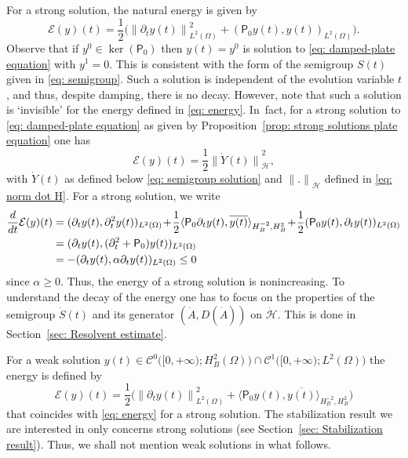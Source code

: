 \documentclass[JEP,XML,SOM,Unicode,published]{cedram}
\theoremstyle{plain}
\theoremstyle{definition}
\let \Re \relax
\DeclareMathOperator{\Re}{Re}
\newcommand{\ovl}[1]{\overline{#1}}
\newcommand{\inp}[2]{(#1, #2)}
\newcommand{\dup}[2]{\langle #1 , #2 \rangle}
\renewcommand{\H}{{\mathcal H}}
\newcommand{\E}{\ensuremath{\mathcal E}}
\newcommand{\Norm}[2]{{\| #1 \|}_{#2}}
\newcommand{\Con}{\ensuremath{\mathscr C}}
\newcommand{\Pell}{\mathsf P_0}
\begin{document}
For a strong solution, the natural energy is given by
\begin{equation}
\label{eq: energy}
\E(y) (t) = \frac12 \big(\Norm{\partial_t y (t)}{L^2(\Omega)}^2
+ \inp{\Pell y (t)}{y (t)}_{L^2(\Omega)}
\big).
\end{equation}
Observe that if $y^0 \in \ker(\Pell)$ then $y(t) = y^0$ is solution
to \eqref{eq: damped-plate equation} with $y^1=0$. This is
consistent with the form of the semigroup $S(t)$ given in \eqref{eq:
semigroup}. Such a solution is independent of the evolution
variable $t$, and thus, despite damping, there is no decay. However,
note that such a solution is `invisible' for the energy defined in
\eqref{eq: energy}. In~fact, for a strong solution to \eqref{eq:
damped-plate equation} as given by Proposition~\ref{prop: strong solutions plate equation} one has
\begin{equation}
\label{eq: connection energy norm H dot}
\E(y) (t) = \frac12 \Norm{\dot Y(t)}{\dot \H}^2,
\end{equation}
with $\dot Y(t)$ as defined below
\eqref{eq: semigroup solution} and $\Norm{.}{\dot \H}$ defined in
\eqref{eq: norm dot H}. For a strong solution, we write
\begin{align*}
\frac{d}{d t} \E(y) (t)
&= \Re \inp{\partial_t y(t) }{\partial_t^2 y(t)}_{L^2(\Omega)}
\!+\! \frac12 \dup{\Pell \partial_t y(t)}{\ovl{y(t)}}_{H^{-2}_B, H^2_B} \!+\! \frac12 \inp{\Pell y(t)}{\partial_t y(t)}_{L^2(\Omega)}\\
&= \Re \inp{\partial_t y(t) }{(\partial_t^2 + \Pell) y(t)}_{L^2(\Omega)}\\
&= - \Re \inp{\partial_t y(t) }{\alpha\partial_t y(t)}_{L^2(\Omega)} \leq 0
\end{align*}
since $\alpha \geq 0$. Thus, the energy of a strong solution is nonincreasing.
To understand the decay of the energy one has to focus on the
properties of the semigroup $\dot S(t)$ and its generator $(\dot A,
D(\dot A))$ on $\dot \H$. This is done in Section~\ref{sec: Resolvent estimate}.

For a weak solution $y(t) \in \Con^0 \big([0,+\infty); H^2_B(\Omega)\big)
\cap \Con^1 \big([0,+\infty); L^2(\Omega) \big)$ the energy is
defined by
\begin{equation*}
\E(y) (t) = \frac12 \big(\Norm{\partial_t y (t)}{L^2(\Omega)}^2
+ \dup{\Pell y (t)}{\ovl{y (t)}}_{H^{-2}_B, H^2_B}
\big)
\end{equation*}
that coincides with \eqref{eq: energy} for a strong solution.
The stabilization result we are interested in only concerns strong
solutions (see Section~\ref{sec: Stabilization result}). Thus, we shall
not mention weak solutions in what follows.
\end{document}
